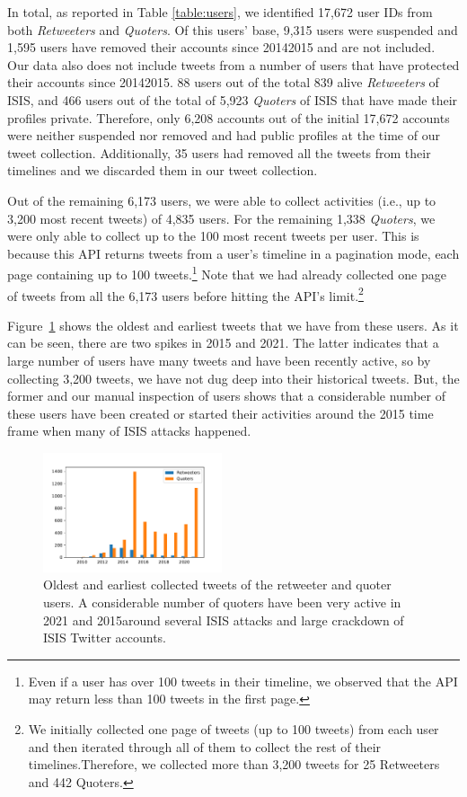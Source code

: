 \documentclass[letterpaper]{article} %
\begin{document}
In total, as reported in Table \ref{table:users}, we identified  17,672 user IDs from both \textit{Retweeters} and \textit{Quoters}. Of this users' base,  9,315 users were  suspended and 1,595 users have removed their accounts since 20142015 and are not included. Our data  also does not include  tweets from  a  number of   users that have protected their accounts since 20142015.  88 users out of the total 839 alive \textit{Retweeters} of ISIS, and 466 users out of the total of 5,923 \textit{Quoters} of ISIS that have made their profiles private. Therefore, only 6,208 accounts out of the initial 17,672 accounts were neither suspended nor removed and had public profiles at the time of our tweet collection. Additionally, 35 users had removed all the tweets from their timelines and we discarded them in our tweet collection.

Out of the remaining 6,173 users, we were able to collect  activities (i.e., up to 3,200 most recent tweets) of 4,835 users. For the remaining 1,338 \textit{Quoters}, we were only able to collect up to the 100 most recent tweets per user. This is because this API returns tweets from a user's timeline in a pagination mode, each page containing up to 100 tweets.\footnote{Even if a user has over 100 tweets in their timeline, we observed that the API may return less than 100 tweets in the first page.}  Note that we had already collected one page of tweets from all the 6,173 users before hitting the API's limit.\footnote{We initially collected one page of tweets (up to 100 tweets) from each user and then iterated through all of them to collect the rest of their timelines.Therefore, we collected more than 3,200  tweets for 25 Retweeters and 442 Quoters.}

Figure~\ref{fig:first-activity} shows the oldest and earliest tweets that we have from these users. As it can be seen, there are two spikes in 2015 and 2021. The latter indicates that a large number of users have many tweets and have been recently active, so by collecting 3,200 tweets, we have not dug deep into their historical tweets. But, the former and our manual inspection of users shows that a considerable number of these users have been created or started their activities around the 2015 time frame when many of ISIS attacks happened.

\begin{figure}[ht]
\includegraphics[width=0.47\textwidth]{img/earliest-activity.pdf}
\caption{Oldest and earliest collected tweets of the retweeter and quoter users. A considerable number of quoters have been very active in 2021 and 2015around several ISIS attacks and large crackdown of ISIS Twitter accounts.}
\label{fig:first-activity}
\end{figure}
\end{document}
